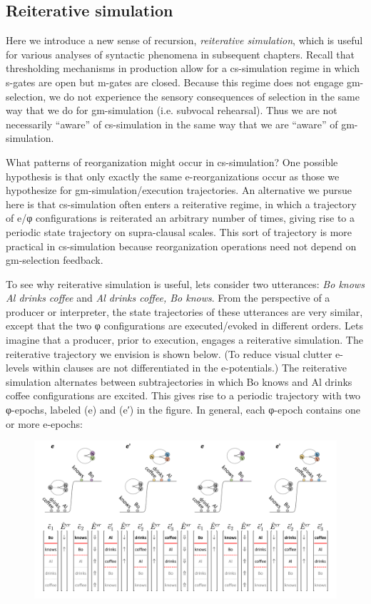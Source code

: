 \subsection{Reiterative simulation}

Here we introduce a new sense of recursion, \textit{reiterative simulation}, which is useful for various analyses of syntactic phenomena in subsequent chapters. Recall that thresholding mechanisms in production allow for a cs-simulation regime in which s-gates are open but m-gates are closed. Because this regime does not engage gm-selection, we do not experience the sensory consequences of selection in the same way that we do for gm-simulation (i.e. subvocal rehearsal). Thus we are not necessarily “aware” of cs-simulation in the same way that we are “aware” of gm-simulation.

  What patterns of reorganization might occur in cs-simulation? One possible hypothesis is that only exactly the same e-reorganizations occur as those we hypothesize for gm-simulation/execution trajectories. An alternative we pursue here is that cs-simulation often enters a reiterative regime, in which a trajectory of e/φ configurations is reiterated an arbitrary number of times, giving rise to a periodic state trajectory on supra-clausal scales. This sort of trajectory is more practical in cs-simulation because reorganization operations need not depend on gm-selection feedback.

  To see why reiterative simulation is useful, lets consider two utterances: \textit{Bo knows Al drinks coffee} and \textit{Al drinks coffee, Bo knows}. From the perspective of a producer or interpreter, the state trajectories of these utterances are very similar, except that the two φ configurations are executed/evoked in different orders. Lets imagine that a producer, prior to execution, engages a reiterative simulation. The reiterative trajectory we envision is shown below. (To reduce visual clutter e-levels within clauses are not differentiated in the e-potentials.) The reiterative simulation alternates between subtrajectories in which {\textbar}Bo knows{\textbar} and {\textbar}Al drinks coffee{\textbar} configurations are excited. This gives rise to a periodic trajectory with two φ-epochs,  labeled (e) and (e′) in the figure. In general, each φ-epoch contains one or more e-epochs:

  
\begin{figure}
\includegraphics[width=\textwidth]{figures/Tilsen-img115.png}
\caption{\missingcaption}
\label{fig:}
\end{figure}
 

